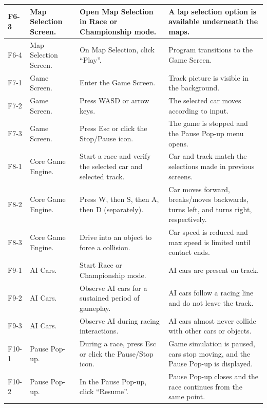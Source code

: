 \documentclass[12pt]{article}
\begin{document}
\begin{longtable}{|l|p{}|p{}|p{}|}
F6-3 & Map Selection Screen. &
Open Map Selection in Race or Championship mode. &
A lap selection option is available underneath the maps. \\
\hline

F6-4 & Map Selection Screen. &
On Map Selection, click “Play”. &
Program transitions to the Game Screen. \\
\hline

F7-1 & Game Screen. &
Enter the Game Screen. &
Track picture is visible in the background. \\
\hline

F7-2 & Game Screen. &
Press WASD or arrow keys. &
The selected car moves according to input. \\
\hline

F7-3 & Game Screen. &
Press Esc or click the Stop/Pause icon. &
The game is stopped and the Pause Pop-up menu opens. \\
\hline

F8-1 & Core Game Engine. &
Start a race and verify the selected car and selected track. &
Car and track match the selections made in previous screens. \\
\hline

F8-2 & Core Game Engine. &
Press W, then S, then A, then D (separately). &
Car moves forward, breaks/moves backwards, turns left, and turns right, respectively. \\
\hline

F8-3 & Core Game Engine. &
Drive into an object to force a collision. &
Car speed is reduced and max speed is limited until contact ends. \\
\hline

F9-1 & AI Cars. &
Start Race or Championship mode. &
AI cars are present on track. \\
\hline

F9-2 & AI Cars. &
Observe AI cars for a sustained period of gameplay. &
AI cars follow a racing line and do not leave the track. \\
\hline

F9-3 & AI Cars. &
Observe AI during racing interactions. &
AI cars almost never collide with other cars or objects. \\
\hline

F10-1 & Pause Pop-up. &
During a race, press Esc or click the Pause/Stop icon. &
Game simulation is paused, cars stop moving, and the Pause Pop-up is displayed. \\
\hline

F10-2 & Pause Pop-up. &
In the Pause Pop-up, click “Resume”. &
Pause Pop-up closes and the race continues from the same point. \\
\hline


\end{longtable}
\end{document}
